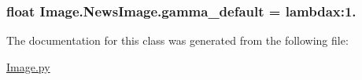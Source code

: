 \subsubsection[{gamma\+\_\+default}]{\setlength{\rightskip}{0pt plus 5cm}float Image.\+News\+Image.\+gamma\+\_\+default = lambdax\+:1.\hspace{0.3cm}{\ttfamily [static]}}\label{class_image_1_1_news_image_a81f48b978e2fd5b4e2880e1719d4349e}


The documentation for this class was generated from the following file\+:\begin{DoxyCompactItemize}
\item 
\hyperlink{_image_8py}{Image.\+py}\end{DoxyCompactItemize}
